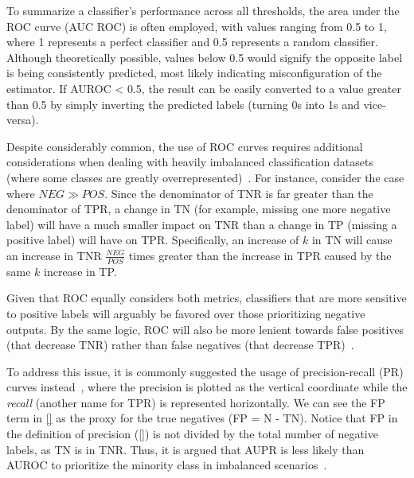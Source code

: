 

To summarize a classifier's performance across all thresholds, the area under the ROC curve (AUC ROC) is often employed, with values ranging from 0.5 to 1, where 1 represents a perfect classifier and 0.5 represents a random classifier. Although theoretically possible, values below 0.5 would signify the opposite label is being consistently predicted, most likely indicating misconfiguration of the estimator. If AUROC < 0.5, the result can be easily converted to a value greater than 0.5 by simply inverting the predicted labels (turning 0s into 1s and vice-versa).

Despite considerably common, the use of ROC curves requires additional considerations when dealing with heavily imbalanced classification datasets (where some classes are greatly overrepresented)~\cite{he2009learning,saito2015precision,fernandez2018learning}.
For instance,%
consider the case where $NEG \gg POS$. Since the denominator of TNR is far greater than the denominator of TPR, a change in TN (for example, missing one more negative label) will have a much smaller impact on TNR than a change in TP (missing a positive label) will have on TPR.
Specifically, an increase of $k$ in TN will cause an increase in TNR $\frac{NEG}{POS}$ times greater than the increase in TPR caused by the same $k$ increase in TP.


Given that ROC equally considers both metrics, classifiers that are more sensitive to positive labels will arguably be favored over those prioritizing negative outputs. By the same logic, ROC will also be more lenient towards false positives (that decrease TNR) rather than false negatives (that decrease TPR)~\cite{}.

To address this issue, it is commonly suggested the usage of precision-recall (PR) curves instead~\cite{ozenne2015precision,he2009learning}, where the precision is plotted as the vertical coordinate while the \emph{recall} (another name for TPR) is represented horizontally.
%
We can see the FP term in \autoref{} as the proxy for the true negatives (FP = N - TN). Notice that FP in the definition of precision (\autoref{}) is not divided by the total number of negative labels, as TN is in TNR. Thus, it is argued that AUPR is less likely than AUROC to prioritize the minority class in imbalanced scenarios~\cite{ozenne2015precision,he2009learning}.

